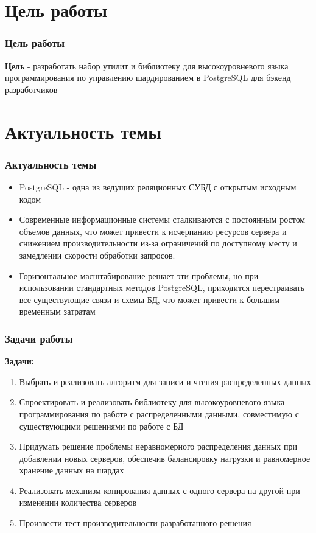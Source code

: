\documentclass[pdf, hyperref={unicode}, aspectratio=169]{beamer}
\begin{document}

{
	\frame{\titlepage}
}




\section{Цель работы}
\begin{frame}
	\frametitle{Цель работы}
	
	\textbf{Цель} - разработать набор утилит и библиотеку для высокоуровневого языка программирования по управлению шардированием в PostgreSQL для бэкенд разработчиков
\end{frame}

\section{Актуальность темы}
\begin{frame}
	\frametitle{Актуальность темы}
	
	
	\begin{itemize}
		\item PostgreSQL - одна из ведущих реляционных СУБД с открытым исходным кодом
		\item Современные информационные системы сталкиваются с постоянным ростом объемов данных,
		что может привести  к исчерпанию ресурсов сервера и снижением производительности из-за ограничений по доступному месту и замедлении скорости обработки запросов.
		\item Горизонтальное масштабирование решает эти проблемы, но при использовании стандартных методов PostgreSQL, приходится перестраивать все существующие связи и схемы БД,
		что может привести к большим временным затратам
	\end{itemize}
\end{frame}


\begin{frame}
	\frametitle{Задачи работы}
	
	\textbf{Задачи:}
	\begin{enumerate}
		\fontsize{10pt}{12pt}\selectfont
		\item Выбрать и реализовать алгоритм для записи и чтения распределенных данных
		\item Спроектировать и реализовать библиотеку для высокоуровневого языка программирования по работе с распределенными данными, совместимую с существующими решениями по работе с БД
		\item Придумать решение проблемы неравномерного распределения данных при добавлении новых серверов, обеспечив балансировку нагрузки и равномерное хранение данных на шардах
		\item Реализовать механизм копирования данных с одного сервера на другой при изменении количества серверов
		\item Произвести тест производительности разработанного решения

	\end{enumerate}
\end{frame}
\end{document}
